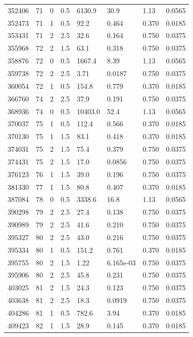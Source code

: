 \documentclass[preview]{standalone}
\begin{document}
{{{{{\begin{tabular}{L{1.2cm}C{1.2cm} C{0.3cm}C{0.5cm} C{1.4cm}C{1.4cm} C{1.4cm}C{1.4cm}}
  352406  &    71  & 0     & 0.5 &  6130.9  & 30.9  & 1.13 &  0.0565   \\ 
  352473  &    71  & 1     & 0.5 &  92.2  & 0.464  & 0.370 &  0.0185   \\ 
  353431  &    71  & 2     & 2.5 &  32.6  & 0.164  & 0.750 &  0.0375   \\ 
  355968  &    72  & 2     & 1.5 &  63.1  & 0.318  & 0.750 &  0.0375   \\ 
  358876  &    72  & 0     & 0.5 &  1667.4  & 8.39  & 1.13 &  0.0565   \\ 
  359738  &    72  & 2     & 2.5 &  3.71  & 0.0187  & 0.750 &  0.0375   \\ 
  360054  &    72  & 1     & 0.5 &  154.8  & 0.779  & 0.370 &  0.0185   \\ 
  366760  &    74  & 2     & 2.5 &  37.9  & 0.191  & 0.750 &  0.0375   \\ 
  368936  &    74  & 0     & 0.5 &  10403.0  & 52.4  & 1.13 &  0.0565   \\ 
  370037  &    75  & 1     & 0.5 &  112.4  & 0.566  & 0.370 &  0.0185   \\ 
  370130  &    75  & 1     & 1.5 &  83.1  & 0.418  & 0.370 &  0.0185   \\ 
  374031  &    75  & 2     & 1.5 &  75.4  & 0.379  & 0.750 &  0.0375   \\ 
  374431  &    75  & 2     & 1.5 &  17.0  & 0.0856  & 0.750 &  0.0375   \\ 
  376123  &    76  & 1     & 1.5 &  39.0  & 0.196  & 0.750 &  0.0375   \\ 
  381330  &    77  & 1     & 1.5 &  80.8  & 0.407  & 0.370 &  0.0185   \\ 
  387084  &    78  & 0     & 0.5 &  3338.6  & 16.8  & 1.13 &  0.0565   \\ 
  390298  &    79  & 2     & 2.5 &  27.4  & 0.138  & 0.750 &  0.0375   \\ 
  390989  &    79  & 2     & 2.5 &  41.6  & 0.210  & 0.750 &  0.0375   \\ 
  395327  &    80  & 2     & 2.5 &  43.0  & 0.216  & 0.750 &  0.0375   \\ 
  395334  &    80  & 1     & 0.5 &  151.2  & 0.761  & 0.370 &  0.0185   \\ 
  395755  &    80  & 2     & 1.5 &  1.22  & 6.165e-03  & 0.750 &  0.0375   \\ 
  395906  &    80  & 2     & 2.5 &  45.8  & 0.231  & 0.750 &  0.0375   \\ 
  403025  &    81  & 2     & 1.5 &  24.3  & 0.123  & 0.750 &  0.0375   \\ 
  403638  &    81  & 2     & 2.5 &  18.3  & 0.0919  & 0.750 &  0.0375   \\ 
  404286  &    81  & 1     & 0.5 &  782.6  & 3.94  & 0.370 &  0.0185   \\ 
  409423  &    82  & 1     & 1.5 &  28.9  & 0.145  & 0.370 &  0.0185   \\ 
\hline 
\end{tabular} 

}}}}}
\end{document}
